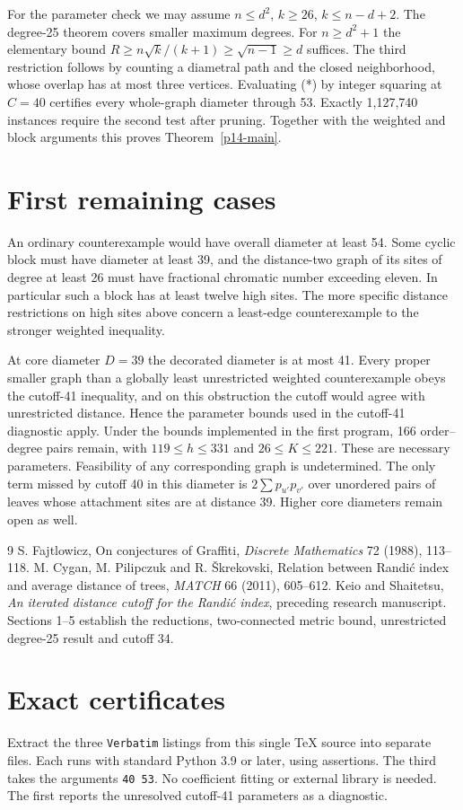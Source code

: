 \documentclass[11pt,a4paper]{article}
\newcommand{\volappendix}{\setcounter{section}{0}\setcounter{subsection}{0}\volumeappendixtrue\renewcommand{\thesection}{\Alph{section}}}
\begin{document}
For the parameter check we may assume $n\le d^2$, $k\ge26$, $k\le n-d+2$. The degree-25 theorem covers smaller maximum degrees. For $n\ge d^2+1$ the elementary bound $R\ge n\sqrt{k}/(k+1)\ge\sqrt{n-1}\ge d$ suffices. The third restriction follows by counting a diametral path and the closed neighborhood, whose overlap has at most three vertices. Evaluating (*) by integer squaring at $C=40$ certifies every whole-graph diameter through 53. Exactly 1,127,740 instances require the second test after pruning. Together with the weighted and block arguments this proves Theorem~\ref{p14-main}.


\section{First remaining cases}
An ordinary counterexample would have overall diameter at least 54. Some cyclic block must have diameter at least 39, and the distance-two graph of its sites of degree at least 26 must have fractional chromatic number exceeding eleven. In particular such a block has at least twelve high sites. The more specific distance restrictions on high sites above concern a least-edge counterexample to the stronger weighted inequality.

At core diameter $D=39$ the decorated diameter is at most 41. Every proper smaller graph than a globally least unrestricted weighted counterexample obeys the cutoff-41 inequality, and on this obstruction the cutoff would agree with unrestricted distance. Hence the parameter bounds used in the cutoff-41 diagnostic apply. Under the bounds implemented in the first program, 166 order--degree pairs remain, with $119\le h\le331$ and $26\le K\le221$. These are necessary parameters. Feasibility of any corresponding graph is undetermined. The only term missed by cutoff 40 in this diameter is $2\sum p_{u'}p_{v'}$ over unordered pairs of leaves whose attachment sites are at distance 39. Higher core diameters remain open as well.
\begin{thebibliography}{9}
 S. Fajtlowicz, On conjectures of Graffiti, \emph{Discrete Mathematics} 72 (1988), 113--118.
 M. Cygan, M. Pilipczuk and R. \v{S}krekovski, Relation between Randi\'c index and average distance of trees, \emph{MATCH} 66 (2011), 605--612.
 Keio and Shaitetsu, \emph{An iterated distance cutoff for the Randi\'c index}, preceding research manuscript. Sections 1--5 establish the reductions, two-connected metric bound, unrestricted degree-25 result and cutoff 34.
\end{thebibliography}
\clearpage\volappendix\section{Exact certificates}
Extract the three \texttt{Verbatim} listings from this single TeX source into separate files. Each runs with standard Python 3.9 or later, using assertions. The third takes the arguments \texttt{40 53}. No coefficient fitting or external library is needed. The first reports the unresolved cutoff-41 parameters as a diagnostic.
\end{document}
